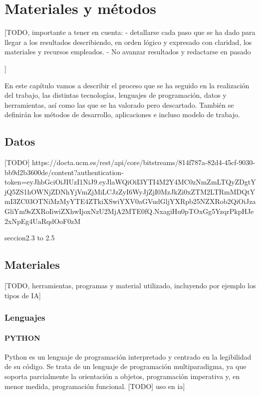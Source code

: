 \chapter{Materiales y métodos}
\label{cap:Materiales y metodos}

[TODO, importante a tener en cuenta:
 -  detallarse cada paso que se ha dado para llegar a los resultados describiendo, en orden lógico y expresado con claridad, los materiales y recursos empleados. 
 - No avanzar resultados y redactarse en pasado

]

En este capítulo vamos a describir el proceso que se ha seguido en la realización del trabajo, las distintas tecnologías, lenguajes de programación, datos y herramientas, así como las que se ha valorado pero descartado. También se definirán los métodos de desarrollo, aplicaciones e incluso modelo de trabajo.

\section{Datos} \label{sec:Materiales_datos}

[TODO]
https://docta.ucm.es/rest/api/core/bitstreams/814f787a-82d4-45cf-9030-bb9d2b3600de/content?authentication-token=eyJhbGciOiJIUzI1NiJ9.eyJlaWQiOiI3YTI4M2Y4MC0zNmZmLTQyZDgtYjQ5ZS1hOWNjZDNhYjVmZjMiLCJzZyI6WyJjZjI0MzJkZi0xZTM2LTRmMDQtYmI3ZC03OTNiMzMyYTE4ZTkiXSwiYXV0aGVudGljYXRpb25NZXRob2QiOiJzaGliYm9sZXRoIiwiZXhwIjoxNzU2MjA2MTE0fQ.NxagiHu0pTOxGg5YzqrPkpHJe2xNpEg4UaRqdOoF0zM

seccion2.3 to 2.5

\section{Materiales}

[TODO, herramientas, programas y material utilizado, incluyendo por ejemplo los tipos de IA]

\subsection{Lenguajes} 

\subsubsection*{PYTHON}
Python es un lenguaje de programación interpretado y centrado en la legibilidad de su código. Se trata de un lenguaje de programación multiparadigma, ya que soporta parcialmente la orientación a objetos, programación imperativa y, en menor medida, programación funcional. [TODO] uso en ia]

